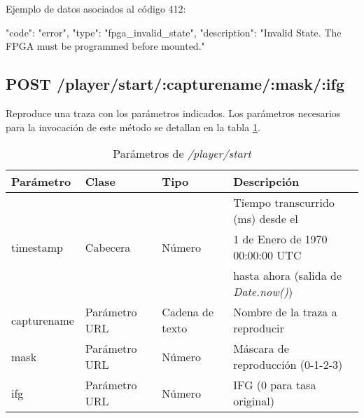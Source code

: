 \begin{itemize}
{\begin{minipage}{\textwidth}
Ejemplo de datos asociados al código 412:

\begin{code}[language=json]
{
  "code": "error",
  "type": "fpga_invalid_state",
  "description": "Invalid State. The FPGA must be programmed before mounted."
}
\end{code}
\end{minipage}
}

\end{itemize}

%
%
\subsection{POST /player/start/:capturename/:mask/:ifg}
Reproduce una \gls{traza} con los parámetros indicados. Los parámetros necesarios para la invocación de este método se detallan en la tabla \ref{extra:api:playerstart:invocacion}.

\begin{table}[H]
\centering
\begin{tabular}{|l|l|l|l|}
\hline
\rowcolor[HTML]{F5F5F5}
\textbf{Parámetro}  & \textbf{Clase} & \textbf{Tipo}   & \textbf{Descripción}                        \\ \hline
                    &                &                 & Tiempo transcurrido (ms) desde el           \\
timestamp           & Cabecera       & Número          & 1 de Enero de 1970 00:00:00 UTC             \\
                    &                &                 & hasta ahora (salida de \textit{Date.now()}) \\ \hline
capturename         & Parámetro URL  & Cadena de texto & Nombre de la \gls{traza} a reproducir       \\ \hline
mask                & Parámetro URL  & Número          & Máscara de reproducción (0-1-2-3)           \\ \hline
ifg                 & Parámetro URL  & Número          & \gls{IFG} (0 para tasa original)            \\ \hline
\end{tabular}
\caption{Parámetros de \textit{/player/start}}
\label{extra:api:playerstart:invocacion}
\end{table}

